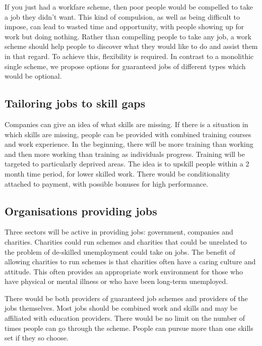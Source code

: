 \documentclass[]{tufte-handout}
\begin{document}
If you just had a workfare scheme, then poor people would be compelled
to take a job they didn't want. This kind of compulsion, as well as
being difficult to impose, can lead to wasted time and opportunity, with
people showing up for work but doing nothing. Rather than compelling
people to take any job, a work scheme should help people to discover
what they would like to do and assist them in that regard. To achieve
this, flexibility is required. In contrast to a monolithic single
scheme, we propose options for guaranteed jobs of different types which
would be optional.

\hypertarget{tailoring-jobs-to-skill-gaps}{%
\subsection{Tailoring jobs to skill
gaps}\label{tailoring-jobs-to-skill-gaps}}

Companies can give an idea of what skills are missing. If there is a
situation in which skills are missing, people can be provided with
combined training courses and work experience. In the beginning, there
will be more training than working and then more working than training
as individuals progress. Training will be targeted to particularly
deprived areas. The idea is to upskill people within a 2 month time
period, for lower skilled work. There would be conditionality attached
to payment, with possible bonuses for high performance.

\hypertarget{organisations-providing-jobs}{%
\subsection{Organisations providing
jobs}\label{organisations-providing-jobs}}

Three sectors will be active in providing jobs: government, companies
and charities. Charities could run schemes and charities that could be
unrelated to the problem of de-skilled unemployment could take on jobs.
The benefit of allowing charities to run schemes is that charities often
have a caring culture and attitude. This often provides an appropriate
work environment for those who have physical or mental illness or who
have been long-term unemployed.

There would be both providers of guaranteed job schemes and providers of
the jobs themselves. Most jobs should be combined work and skills and
may be affiliated with education providers. There would be no limit on
the number of times people can go through the scheme. People can pursue
more than one skills set if they so choose.
\end{document}
